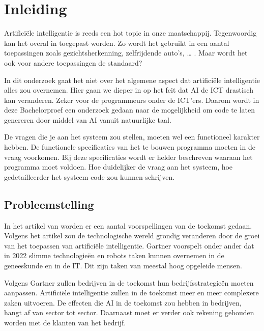 
\chapter*{Inleiding}
\label{ch:inleiding}

Artificiële intelligentie is reeds een hot topic in onze maatschappij. Tegenwoordig kan het overal in toegepast worden. Zo wordt het gebruikt in een aantal toepassingen zoals gezichtsherkenning, zelfrijdende auto’s, … . Maar wordt het ook voor andere toepassingen de standaard?

In dit onderzoek gaat het niet over het algemene aspect dat artificiële intelligentie alles zou overnemen. Hier gaan we dieper in op het feit dat AI de ICT drastisch kan veranderen. Zeker voor de programmeurs onder de ICT’ers. Daarom wordt in deze Bachelorproef een onderzoek gedaan naar de mogelijkheid om code te laten genereren door middel van AI vanuit natuurlijke taal. 

De vragen die je aan het systeem zou stellen, moeten wel een functioneel karakter hebben. De functionele specificaties van het te bouwen programma moeten in de vraag voorkomen. Bij deze specificaties wordt er helder beschreven waaraan het programma moet voldoen. Hoe duidelijker de vraag aan het systeem, hoe gedetailleerder het systeem code zou kunnen schrijven.  

\section{Probleemstelling}
\label{sec:probleemstelling}

In het artikel van \textcite{Gartner} worden er een aantal voorspellingen van de toekomst gedaan. Volgens het artikel zou de technologische wereld grondig veranderen door de groei van het toepassen van artificiële intelligentie.  Gartner voorspelt onder ander dat in 2022 slimme technologieën en robots taken kunnen overnemen in de geneeskunde en in de IT. Dit zijn taken van meestal hoog opgeleide mensen.

Volgens Gartner zullen bedrijven in de toekomst hun bedrijfsstrategieën moeten aanpassen. Artificiële intelligentie zullen in de toekomst meer en meer complexere zaken uitvoeren. De effecten die AI in de toekomst zou hebben in bedrijven, hangt af van sector tot sector. Daarnaast moet er verder ook rekening gehouden worden met de klanten van het bedrijf. 

